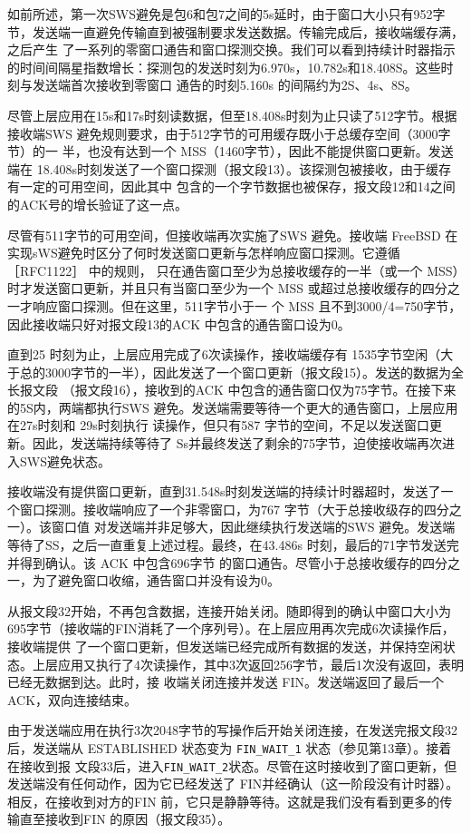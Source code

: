 如前所述，第一次SWS避免是包6和包7之间的5s延时，由于窗口大小只有952字节，发送端一直避免传输直到被强制要求发送数据。传输完成后，接收端缓存满，之后产生
了一系列的零窗口通告和窗口探测交换。我们可以看到持续计时器指示的时间间隔星指数增长：探测包的发送时刻为6.970s，10.782s和18.408S。这些时刻与发送端首次接收到零窗口
通告的时刻5.160s 的间隔约为2S、4s、8S。

尽管上层应用在15s和17s时刻读数据，但至18.408s时刻为止只读了512字节。根据接收端SWS 避免规则要求，由于512字节的可用缓存既小于总缓存空间（3000字节）的一
半，也没有达到一个 MSS（1460字节），因此不能提供窗口更新。发送端在 18.408s时刻发送了一个窗口探测（报文段13）。该探测包被接收，由于缓存有一定的可用空间，因此其中
包含的一个字节数据也被保存，报文段12和14之间的ACK号的增长验证了这一点。

尽管有511字节的可用空间，但接收端再次实施了SWS 避免。接收端 FreeBSD 在实现sWS避免时区分了何时发送窗口更新与怎样响应窗口探测。它遵循［RFC1122］ 中的规则，
只在通告窗口至少为总接收缓存的一半（或一个 MSS）时才发送窗口更新，并且只有当窗口至少为一个 MSS 或超过总接收缓存的四分之一才响应窗口探测。但在这里，511字节小于一
个 MSS 且不到3000/4=750字节，因此接收端只好对报文段13的ACK 中包含的通告窗口设为0。

直到25 时刻为止，上层应用完成了6次读操作，接收端缓存有 1535字节空闲（大于总的3000字节的一半），因此发送了一个窗口更新（报文段15）。发送的数据为全长报文段
（报文段16），接收到的ACK 中包含的通告窗口仅为75字节。在接下来的5S内，两端都执行SWS 避免。发送端需要等待一个更大的通告窗口，上层应用在27s时刻和 29s时刻执行
读操作，但只有587 字节的空间，不足以发送窗口更新。因此，发送端持续等待了 Ss并最终发送了剩余的75字节，迫使接收端再次进入SWS避免状态。

接收端没有提供窗口更新，直到31.548s时刻发送端的持续计时器超时，发送了一个窗口探测。接收端响应了一个非零窗口，为767 字节（大于总接收级存的四分之一）。该窗口值
对发送端并非足够大，因此继续执行发送端的SWS 避免。发送端等待了SS，之后一直重复上述过程。最终，在43.486s 时刻，最后的71字节发送完并得到确认。该 ACK 中包含696字节
的窗口通告。尽管小于总接收缓存的四分之一，为了避免窗口收缩，通告窗口并没有设为0。

从报文段32开始，不再包含数据，连接开始关闭。随即得到的确认中窗口大小为695字节（接收端的FIN消耗了一个序列号）。在上层应用再次完成6次读操作后，接收端提供
了一个窗口更新，但发送端已经完成所有数据的发送，并保持空闲状态。上层应用又执行了4次读操作，其中3次返回256字节，最后1次没有返回，表明已经无数据到达。此时，接
收端关闭连接并发送 FIN。发送端返回了最后一个 ACK，双向连接结束。

由于发送端应用在执行3次2048字节的写操作后开始关闭连接，在发送完报文段32后，发送端从 ESTABLISHED 状态变为 \verb|FIN_WAIT_1| 状态（参见第13章）。接着在接收到报
文段33后，进入\verb|FIN_WAIT_2|状态。尽管在这时接收到了窗口更新，但发送端没有任何动作，因为它已经发送了 FIN并经确认（这一阶段没有计时器）。相反，在接收到对方的FIN
前，它只是静静等待。这就是我们没有看到更多的传输直至接收到FIN 的原因（报文段35）。

